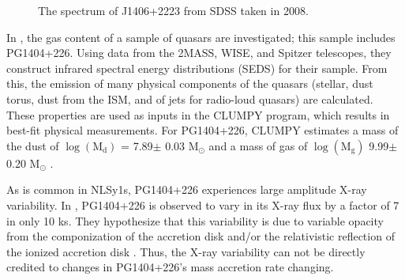 \begin{figure}[h]
\centering
{}
\caption{The spectrum of J1406+2223 from SDSS taken in 2008. }
\label{imbeded_fb}
\end{figure}

In \cite{shangguan2018}, the gas content of a sample of quasars are investigated; this sample includes PG1404+226.
Using data from the 2MASS, WISE, and Spitzer telescopes, they construct infrared spectral energy distributions (SEDS) for their sample.
From this, the emission of many physical components of the quasars (stellar, dust torus, dust from the ISM, and of jets for radio-loud quasars) are calculated. 
These properties are used as inputs in the CLUMPY program, which results in best-fit physical measurements.
For PG1404+226, CLUMPY estimates a mass of the dust of $\log(\text{M}_{ \text{d}  }  )$ = 7.89$\pm$ 0.03 M$_{\odot}$ and a mass of gas of $\log(\text{M}_{\text{g}}   )$ 9.99$\pm$0.20 M$_{\odot}$ \citep{shangguan2018}.

As is common in NLSy1s, PG1404+226 experiences large amplitude X-ray variability. 
In \cite{mallick2018}, PG1404+226 is observed to vary in its X-ray flux by a factor of 7 in only 10 ks. 
They hypothesize that this variability is due to variable opacity from the componization of the accretion disk and/or the relativistic reflection of the ionized accretion disk \citep{mallick2018}. 
Thus, the X-ray variability can not be directly credited to changes in PG1404+226’s mass accretion rate changing.

\FloatBarrier


